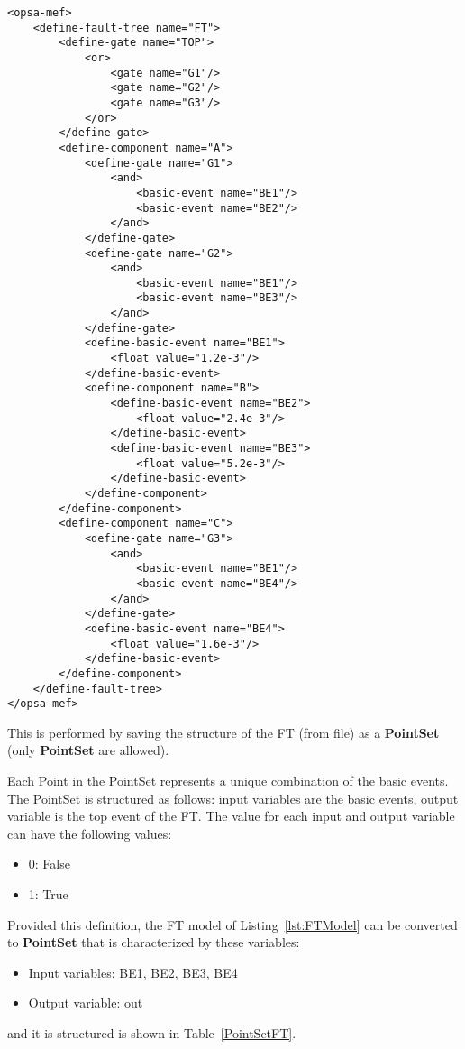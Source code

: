 \begin{lstlisting}[style=XML,morekeywords={anAttribute},caption=FT in OpenPSA format., label=lst:FTModel]
<opsa-mef>
    <define-fault-tree name="FT">
        <define-gate name="TOP">
            <or>
                <gate name="G1"/>
                <gate name="G2"/>
                <gate name="G3"/>
            </or>
        </define-gate>
        <define-component name="A">
            <define-gate name="G1">
                <and>
                    <basic-event name="BE1"/>
                    <basic-event name="BE2"/>
                </and>
            </define-gate>
            <define-gate name="G2">
                <and>
                    <basic-event name="BE1"/>
                    <basic-event name="BE3"/>
                </and>
            </define-gate>
            <define-basic-event name="BE1">
                <float value="1.2e-3"/>
            </define-basic-event>
            <define-component name="B">
                <define-basic-event name="BE2">
                    <float value="2.4e-3"/>
                </define-basic-event>
                <define-basic-event name="BE3">
                    <float value="5.2e-3"/>
                </define-basic-event>
            </define-component>
        </define-component>
        <define-component name="C">
            <define-gate name="G3">
                <and>
                    <basic-event name="BE1"/>
                    <basic-event name="BE4"/>
                </and>
            </define-gate>
            <define-basic-event name="BE4">
                <float value="1.6e-3"/>
            </define-basic-event>
        </define-component>
    </define-fault-tree>
</opsa-mef>
\end{lstlisting}

This is performed by saving the structure of the FT (from file) as a \textbf{PointSet}
(only \textbf{PointSet} are allowed).

Each Point in the PointSet represents a unique combination of the basic events.
The PointSet is structured as follows: input variables are the basic events, output variable is the top event of the FT.
The value for each input and output variable can have the following values:
\begin{itemize}
  \item  0: False
  \item  1: True
\end{itemize}

Provided this definition, the FT model of Listing~\ref{lst:FTModel} can be converted to
\textbf{PointSet} that is characterized by these variables:
\begin{itemize}
	\item Input variables: BE1, BE2, BE3, BE4
	\item Output variable: out
\end{itemize}
and it is structured is shown in Table~\ref{PointSetFT}.

